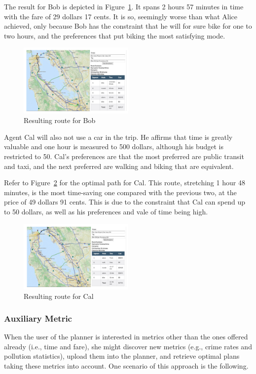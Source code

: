 \documentclass[letterpaper]{article}
\newcommand{\figref}[1]{Figure~\ref{fig:#1}}
\begin{document}
The result for Bob is depicted in \figref{bob}.
It spans 2 hours 57 minutes in time with the fare of 29 dollars 17 cents.
It is so, seemingly worse than what Alice achieved, only because Bob has
the constraint that he will for sure bike for one to two hours, and
the preferences that put biking the most satisfying mode.

\begin{figure}[!ht]
  \centering
    \includegraphics[width=0.5\textwidth]{figs/result_Bob.pdf}
  \caption{Resulting route for Bob\label{fig:bob}}
\end{figure}


Agent Cal will also not use a car in the trip.
He affirms that time is greatly valuable and one hour is measured
to 500 dollars, although his budget is restricted to 50.
Cal's preferences are that the most preferred are public transit
and taxi, and the next preferred are walking and biking that
are equivalent.

Refer to \figref{cal} for the optimal path for Cal.
This route, stretching 1 hour 48 minutes, is the most time-saving one 
compared with the previous two, at the price of 49 dollars 91 cents.
This is due to the constraint that Cal can spend up to 50 dollars,
as well as his preferences and vale of time being high.

\begin{figure}[!ht]
  \centering
    \includegraphics[width=0.5\textwidth]{figs/result_Cal.pdf}
  \caption{Resulting route for Cal\label{fig:cal}}
\end{figure}

\subsubsection{Auxiliary Metric}
When the user of the planner is interested in metrics other than
the ones offered already (i.e., time and fare), she might discover
new metrics (e.g., crime rates and pollution statistics), upload
them into the planner, and retrieve optimal plans taking these
metrics into account.  One scenario of this approach is the following.
\end{document}
